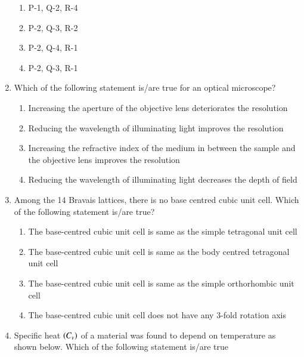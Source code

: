 \documentclass[journal]{IEEEtran}
\numberwithin{equation}{enumi}
\numberwithin{figure}{enumi}
\begin{document}
\begin{enumerate}
		\hfill{}

		\begin{enumerate}
			\item P-1, Q-2, R-4
			\item P-2, Q-3, R-2
			\item P-2, Q-4, R-1
			\item P-2, Q-3, R-1
		\end{enumerate}

	\item Which of the following statement is/are true for an optical microscope?
		
		\hfill{}

		\begin{enumerate}
			\item Increasing the aperture of the objective lens deteriorates the resolution
			\item Reducing the wavelength of illuminating light improves the resolution
			\item Increasing the refractive index of the medium in between the sample and the objective lens improves the resolution
			\item Reducing the wavelength of illuminating light decreases the depth of field
		\end{enumerate}

	\item Among the 14 Bravais lattices, there is no base centred cubic unit cell. Which of the following statement is/are true?
		
		\hfill{}

		\begin{enumerate}
			\item The base-centred cubic unit cell is same as the simple tetragonal unit cell
			\item The base-centred cubic unit cell is same as the body centred tetragonal unit cell
			\item The base-centred cubic unit cell is same as the simple orthorhombic unit cell
			\item The base-centred cubic unit cell does not have any 3-fold rotation axis
		\end{enumerate}

	\item Specific heat $\left(C_v\right)$ of a material was found to depend on temperature as shown below. Which of the following statement is/are true 


\end{enumerate}
\end{document}
